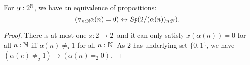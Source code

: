 \begin{lemma}\label{ClosedPropAsSpectrum}
  For $\alpha:2^{\mathbb{N}}$, we have an equivalence of propositions: 
  $$
    (\forall_{n:\mathbb{N}} \alpha(n) = 0 )\leftrightarrow Sp(2/(\alpha(n))_{n:\mathbb{N}}).
  $$
\end{lemma}
\begin{proof}
  There is at most one $x:2\to 2$, and it can only satisfy 
  $x(\alpha(n)) = 0$ for all $n:\mathbb{N}$ iff 
  $\alpha(n) \neq_2 1$ for all $n:\mathbb{N}$. 
  As $2$ has underlying set $\{0,1\}$, we have $(\alpha(n) \neq_2 1) \to (\alpha(n) =_2 0)$. 
\end{proof}






